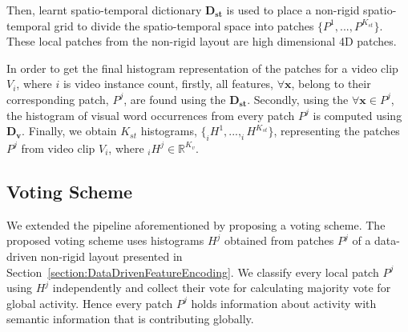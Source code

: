 \documentclass[a4paper, 10pt, conference]{ieeeconf}      %
\begin{document}

Then, learnt spatio-temporal dictionary $\mathbf{D_{st}}$ is used to place a non-rigid spatio-temporal grid to divide the spatio-temporal space into patches $\{P^{1},...,P^{K_{st}}\}$. These local patches from the non-rigid layout are high dimensional 4D patches. 


    
	In order to get the final histogram representation of the patches for a video clip $V_{i}$, where $i$ is video instance count, firstly, all features, $\forall \mathbf{x}$, belong to their corresponding patch, $P^{j}$, are found using the $\mathbf{D_{st}}$. Secondly, using the $\forall \mathbf{x} \in P^{j}$, the histogram of visual word occurrences from every patch $P^{j}$ is computed using $\mathbf{D_{v}}$. Finally, we obtain $K_{st}$ histograms, $\{_{i}H^{1},..., _{i}H^{K_{st}}\}$, representing the patches $P^{j}$ from video clip $V_{i}$, where $_{i}H^{j} \in \mathbb{R}^{K_{v}}$.
\subsection{Voting Scheme}
\label{section:VotingScheme}
We extended the pipeline aforementioned by proposing a voting scheme. The proposed voting scheme uses histograms $H^{j}$ obtained from patches $P^{j}$ of a data-driven non-rigid layout presented in Section~\ref{section:DataDrivenFeatureEncoding}. We classify every local patch $P^{j}$ using $H^{j}$ independently and collect their vote for calculating majority vote for global activity. Hence every patch $P^{j}$ holds information about activity with semantic information that is contributing globally. 
\end{document}

